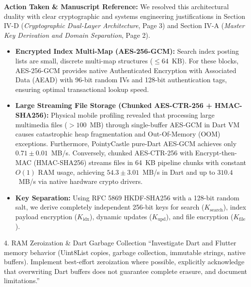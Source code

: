 \documentclass[11pt,a4paper]{article}
\begin{document}
\begin{responsebox}
\textbf{Action Taken \& Manuscript Reference:} We resolved this architectural duality with clear cryptographic and systems engineering justifications in Section IV-D (\emph{Cryptographic Dual-Layer Architecture}, Page 3) and Section IV-A (\emph{Master Key Derivation and Domain Separation}, Page 2).

\begin{itemize}[itemsep=2pt]
    \item \textbf{Encrypted Index Multi-Map (AES-256-GCM):} Search index posting lists are small, discrete multi-map structures ($\le 64$~KB). For these blocks, AES-256-GCM provides native Authenticated Encryption with Associated Data (AEAD) with 96-bit random IVs and 128-bit authentication tags, ensuring optimal transactional lookup speed.
    \item \textbf{Large Streaming File Storage (Chunked AES-CTR-256 + HMAC-SHA256):} Physical mobile profiling revealed that processing large multimedia files ($> 100$~MB) through single-buffer AES-GCM in Dart VM causes catastrophic heap fragmentation and Out-Of-Memory (OOM) exceptions. Furthermore, PointyCastle pure-Dart AES-GCM achieves only $0.71 \pm 0.01$~MB/s. Conversely, chunked AES-CTR-256 with Encrypt-then-MAC (HMAC-SHA256) streams files in 64~KB pipeline chunks with constant $O(1)$ RAM usage, achieving $54.3 \pm 3.01$~MB/s in Dart and up to $310.4$~MB/s via native hardware crypto drivers.
    \item \textbf{Key Separation:} Using RFC 5869 HKDF-SHA256 with a 128-bit random salt, we derive completely independent 256-bit keys for search ($K_{\text{search}}$), index payload encryption ($K_{\text{idx}}$), dynamic updates ($K_{\text{upd}}$), and file encryption ($K_{\text{file}}$).
\end{itemize}
\end{responsebox}

\vspace{1em}

\begin{reviewbox}{4. RAM Zeroization \& Dart Garbage Collection}
``Investigate Dart and Flutter memory behavior (Uint8List copies, garbage collection, immutable strings, native buffers). Implement best-effort zeroization where possible, explicitly acknowledge that overwriting Dart buffers does not guarantee complete erasure, and document limitations.''
\end{reviewbox}
\end{document}
